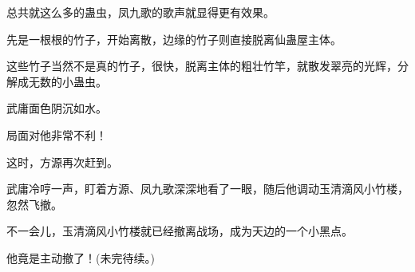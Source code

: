 \begin{this_body}
总共就这么多的蛊虫，凤九歌的歌声就显得更有效果。

先是一根根的竹子，开始离散，边缘的竹子则直接脱离仙蛊屋主体。

这些竹子当然不是真的竹子，很快，脱离主体的粗壮竹竿，就散发翠亮的光辉，分解成无数的小蛊虫。

武庸面色阴沉如水。

局面对他非常不利！

这时，方源再次赶到。

武庸冷哼一声，盯着方源、凤九歌深深地看了一眼，随后他调动玉清滴风小竹楼，忽然飞撤。

不一会儿，玉清滴风小竹楼就已经撤离战场，成为天边的一个小黑点。

他竟是主动撤了！(未完待续。)

\end{this_body}

